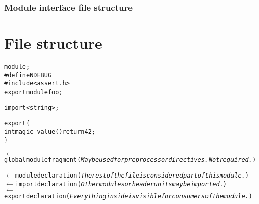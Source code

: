 \documentclass{beamer}
\begin{document}
%
%
\begin{frame}[plain]
\frametitle{Module interface file structure}
\section{File structure}
\begin{multicols}{2}
\begin{alltt}\scriptsize
module;\\

\#define NDEBUG\\
\#include <assert.h>\\

export module foo;\\
\vspace{7mm}

import <string>;\\
\vspace{6.5mm}

export \{\\
\qquad int magic\_value() { return 42; }\\
\}
\columnbreak

$\leftarrow$ global module fragment (\textit{May be used for preprocessor directives. Not required.})\\
\vspace{3.5mm}

$\leftarrow$ module declaration (\textit{The rest of the file is considered part of this module.})\\

$\leftarrow$ import declaration (\textit{Other modules or header units may be imported.})\\

$\leftarrow$ export declaration (\textit{Everything inside is visible for consumers of the module.})

\end{alltt}
\end{multicols}
\end{frame}
\end{document}
